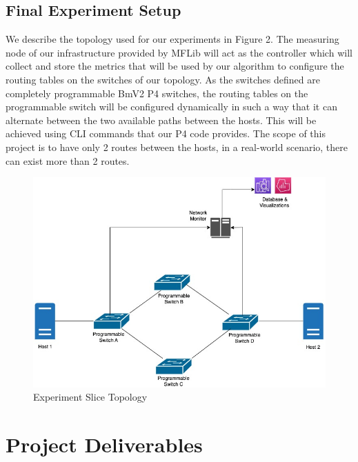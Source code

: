 \documentclass[conference]{IEEEtran}
\begin{document}
    \subsection{Final Experiment Setup}
    We describe the topology used for our experiments in Figure 2. The measuring node of our infrastructure provided by MFLib will act as the controller which will collect and store the metrics that will be used by our algorithm to configure the routing tables on the switches of our topology. As the switches defined are completely programmable BmV2 P4 switches, the routing tables on the programmable switch will be configured dynamically in such a way that it can alternate between the two available paths between the hosts. This will be achieved using CLI commands that our P4 code provides.
    The scope of this project is to have only 2 routes between the hosts, in a real-world scenario, there can exist more than 2 routes.

    \begin{figure}[h!]
        \centering
        \includegraphics[scale=0.3]{Project_Proposal_Topology.jpeg}
        \caption{Experiment Slice Topology}
    \end{figure}


    \section{Project Deliverables}
\end{document}
